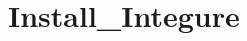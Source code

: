 \documentclass[11pt,twoside,notitlepage]{book}
\begin{document}
\frontmatter

\pagestyle{fancy}

\mainmatter

\setcounter{chapter}{7}
\setcounter{page}{1}

\chapter{Install_Integure}





\end{document}
